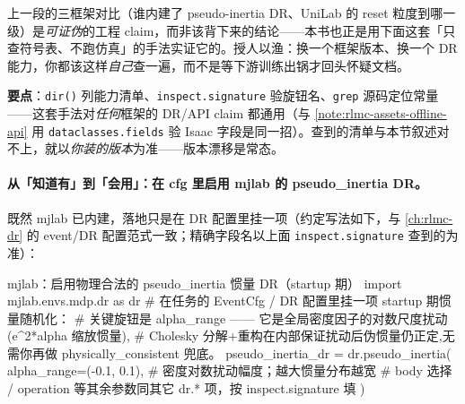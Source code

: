 \begin{note}\label{note:rlmc-assets-verify-claim}
上一段的三框架对比（谁内建了 pseudo-inertia DR、UniLab 的 reset 粒度到哪一级）是\emph{可证伪}的工程 claim，而非该背下来的结论——本书也正是用下面这套「只查符号表、不跑仿真」的手法实证它的。授人以渔：换一个框架版本、换一个 DR 能力，你都该这样\emph{自己}查一遍，而不是等下游训练出锅才回头怀疑文档。
\textbf{要点}：\texttt{dir()} 列能力清单、\texttt{inspect.signature} 验旋钮名、\texttt{grep} 源码定位常量——这套手法对\emph{任何}框架的 DR/API claim 都通用（与 \cref{note:rlmc-assets-offline-api} 用 \texttt{dataclasses.fields} 验 Isaac 字段是同一招）。查到的清单与本节叙述对不上，就以\emph{你装的版本}为准——版本漂移是常态。
\end{note}

\paragraph{从「知道有」到「会用」：在 cfg 里启用 mjlab 的 pseudo\_inertia DR。}既然 mjlab 已内建，落地只是在 DR 配置里挂一项（约定写法如下，与 \cref{ch:rlmc-dr} 的 event/DR 配置范式一致；精确字段名以上面 \texttt{inspect.signature} 查到的为准）：

\begin{codebox}[Python]{mjlab：启用物理合法的 pseudo\_inertia 惯量 DR（startup 期）}
import mjlab.envs.mdp.dr as dr
# 在任务的 EventCfg / DR 配置里挂一项 startup 期惯量随机化：
# 关键旋钮是 alpha_range —— 它是全局密度因子的对数尺度扰动(e^{2*alpha} 缩放惯量),
# Cholesky 分解+重构在内部保证扰动后伪惯量仍正定,无需你再做 physically_consistent 兜底。
pseudo_inertia_dr = dr.pseudo_inertia(
    alpha_range=(-0.1, 0.1),     # 密度对数扰动幅度；越大惯量分布越宽
    # body 选择 / operation 等其余参数同其它 dr.* 项，按 inspect.signature 填
)
\end{codebox}

